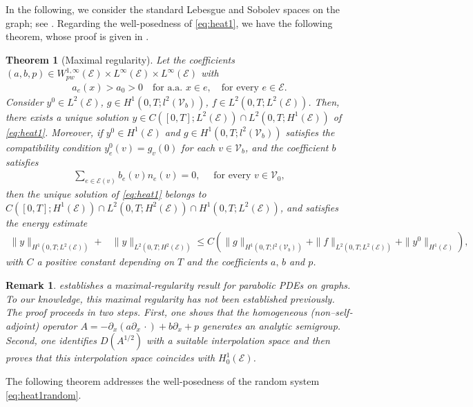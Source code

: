 \documentclass[a4paper, 10pt, english]{article}
\newtheorem{theorem}{Theorem}[section]
\newtheorem{remark}{Remark}[section]
\begin{document}
In the following, we consider the standard Lebesgue and Sobolev spaces on the graph; see .
Regarding the well-posedness of \eqref{eq:heat1}, we have the following theorem, whose proof is given in . 
\begin{theorem}[Maximal regularity]\label{th:well_posedness_nonhomo}
    Let the coefficients $(a,b,p)\in W^{1,\infty}_{pw}(\mathcal{E})\times L^\infty(\mathcal{E})\times L^\infty(\mathcal{E})$ with 
    \begin{align}\label{eq:assumption_coef_a}
        a_e(x)>a_0>0 \quad \text{for a.a.  } x\in e,\quad \text{for every } e\in\mathcal{E}.
    \end{align}
    Consider $y^0 \in L^2(\mathcal{E})$, $g \in H^1(0, T; l^2(\mathcal{V}_b))$, $f \in L^2(0, T; L^2(\mathcal{E}))$. Then, there exists a unique solution $y \in C([0, T]; L^2(\mathcal{E})) \cap L^2(0, T; H^1(\mathcal{E}))$ of \eqref{eq:heat1}. Moreover, if $y^0 \in H^1(\mathcal{E})$ and $g \in H^1(0, T; l^2(\mathcal{V}_b))$ satisfies the compatibility condition $y_e^0(v) = g_v(0)$ for each $v \in \mathcal{V}_b$, and the coefficient $b$ satisfies   
    \begin{align}\label{eq:assumption_coef_b}
        \sum_{e\in \mathcal{E}(v)}b_e(v)n_e(v) = 0, \quad\text{ for every }v\in \mathcal{V}_0,
    \end{align}
    then the unique solution of \eqref{eq:heat1} belongs to $C([0, T]; H^1(\mathcal{E}))\cap L^2(0,T; H^2(\mathcal{E}))\cap H^1(0,T; L^2(\mathcal{E}))$, and satisfies the energy estimate \begin{align}\label{eq:energy_estimation_y_wellposedness}
    \|y\|_{H^1(0,T;L^2(\mathcal{E}))} +&\|y\|_{L^2(0,T;H^2(\mathcal{E}))} \leq C \left( \|g\|_{H^1(0, T;l^2(\mathcal{V}_b))}+\|f\|_{L^2(0, T;L^2(\mathcal{E}))} + \|y^0\|_{H^1(\mathcal{E})} \right),
    \end{align}
    with $C$ a positive constant depending on $T$ and the coefficients $a,\,b$ and $p$.
\end{theorem}
\begin{remark}
     establishes a maximal‐regularity result for parabolic PDEs on graphs. To our knowledge, this maximal regularity has not been established previously. The proof proceeds in two steps. First, one shows that the homogeneous (non–self‐adjoint) operator $A=-\partial_x(a\partial_x\,\cdot)+b\partial_x+p$ generates an analytic semigroup. Second, one identifies $D(A^{1/2})$ with a suitable interpolation space and then proves that this interpolation space coincides with $H_0^1(\mathcal{E})$.
\end{remark}
The following theorem addresses the well-posedness of the random system \eqref{eq:heat1random}.
\end{document}
